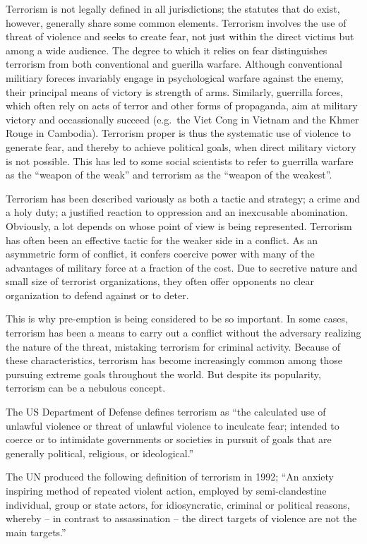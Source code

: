 \documentclass[
  openany]{book}
\begin{document}
Terrorism is not legally defined in all jurisdictions; the statutes that do exist, however, generally share some common elements. Terrorism involves the use of threat of violence and seeks to create fear, not just within the direct victims but among a wide audience. The degree to which it relies on fear distinguishes terrorism from both conventional and guerilla warfare. Although conventional militiary foreces invariably engage in psychological warfare against the enemy, their principal means of victory is strength of arms. Similarly, guerrilla forces, which often rely on acts of terror and other forms of propaganda, aim at military victory and occassionally succeed (e.g.~the Viet Cong in Vietnam and the Khmer Rouge in Cambodia). Terrorism proper is thus the systematic use of violence to generate fear, and thereby to achieve political goals, when direct military victory is not possible. This has led to some social scientists to refer to guerrilla warfare as the ``weapon of the weak'' and terrorism as the ``weapon of the weakest''.

Terrorism has been described variously as both a tactic and strategy; a crime and a holy duty; a justified reaction to oppression and an inexcusable abomination. Obviously, a lot depends on whose point of view is being represented. Terrorism has often been an effective tactic for the weaker side in a conflict. As an asymmetric form of conflict, it confers coercive power with many of the advantages of military force at a fraction of the cost. Due to secretive nature and small size of terrorist organizations, they often offer opponents no clear organization to defend against or to deter.

This is why pre-emption is being considered to be so important. In some cases, terrorism has been a means to carry out a conflict without the adversary realizing the nature of the threat, mistaking terrorism for criminal activity. Because of these characteristics, terrorism has become increasingly common among those pursuing extreme goals throughout the world. But despite its popularity, terrorism can be a nebulous concept.

The US Department of Defense defines terrorism as ``the calculated use of unlawful violence or threat of unlawful violence to inculcate fear; intended to coerce or to intimidate governments or societies in pursuit of goals that are generally political, religious, or ideological.''

The UN produced the following definition of terrorism in 1992; ``An anxiety inspiring method of repeated violent action, employed by semi-clandestine individual, group or state actors, for idiosyncratic, criminal or political reasons, whereby -- in contrast to assassination -- the direct targets of violence are not the main targets.''
\end{document}
